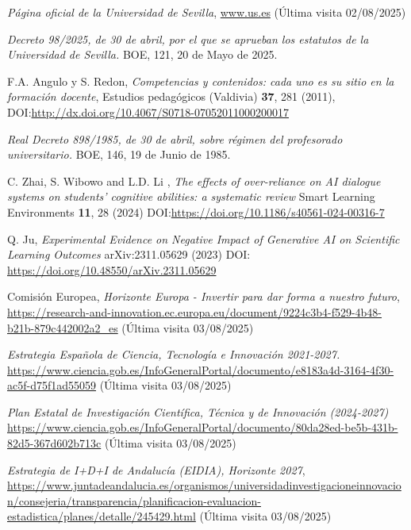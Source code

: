 \documentclass[a4paper,12pt,twoside]{article}
\begin{document}
\begin{thebibliography}{99}
 \textit{Página oficial de la Universidad de Sevilla}, \url{www.us.es} (Última visita 02/08/2025)

 \textit{Decreto 98/2025, de 30 de abril, por el que se aprueban los estatutos de la Universidad de Sevilla.} BOE, 121, 20 de Mayo de 2025.

 F.A. Angulo y S. Redon, \textit{Competencias y contenidos: cada uno es su sitio en la formación docente}, Estudios pedagógicos (Valdivia) \textbf{37}, 281 (2011), DOI:\url{http://dx.doi.org/10.4067/S0718-07052011000200017 }

\textit{Real Decreto 898/1985, de 30 de abril, sobre régimen del profesorado universitario.} BOE, 146, 19 de Junio de 1985.

C. Zhai, S. Wibowo and L.D. Li , \textit{The effects of over-reliance on AI dialogue systems on students' cognitive abilities: a systematic review} Smart Learning Environments \textbf{11}, 28 (2024)  DOI:\url{https://doi.org/10.1186/s40561-024-00316-7}

Q. Ju, \textit{Experimental Evidence on Negative Impact of Generative AI on Scientific Learning Outcomes} arXiv:2311.05629 (2023) DOI:\url{
https://doi.org/10.48550/arXiv.2311.05629}

Comisión Europea, \textit{Horizonte Europa - Invertir para dar forma a nuestro futuro}, \url{https://research-and-innovation.ec.europa.eu/document/9224c3b4-f529-4b48-b21b-879c442002a2_es} (Última visita 03/08/2025)

 \textit{Estrategia Española de Ciencia, Tecnología e Innovación
2021-2027.} \url{https://www.ciencia.gob.es/InfoGeneralPortal/documento/e8183a4d-3164-4f30-ac5f-d75f1ad55059} (Última visita 03/08/2025)

 \textit{Plan Estatal de Investigación
Científica, Técnica y de Innovación (2024-2027)} \url{https://www.ciencia.gob.es/InfoGeneralPortal/documento/80da28ed-be5b-431b-82d5-367d602b713c} (Última visita 03/08/2025)

\textit{Estrategia de I+D+I de Andalucía (EIDIA), Horizonte 2027}, \url{https://www.juntadeandalucia.es/organismos/universidadinvestigacioneinnovacion/consejeria/transparencia/planificacion-evaluacion-estadistica/planes/detalle/245429.html} (Última visita 03/08/2025)
\end{thebibliography}
\end{document}
